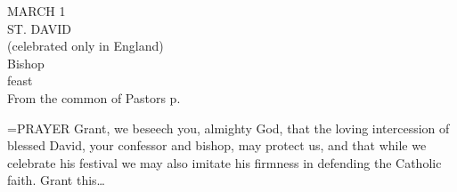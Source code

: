 \begin{center}\normalsize MARCH 1\\
\footnotesize ST. DAVID\\
\footnotesize (celebrated only in England)\\
\footnotesize Bishop\\
\footnotesize feast\\
\footnotesize From the common of Pastors p. \\
\end{center}

\hangindent=\parindent \small{PRAYER 
Grant, we beseech you, almighty God, that the loving
intercession of blessed David, your confessor and bishop, may protect
us, and that while we celebrate his festival we may also imitate his
firmness in defending the Catholic faith. Grant this…\\}
 
